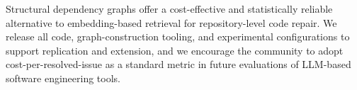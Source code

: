 Structural dependency graphs offer a cost-effective and statistically reliable alternative to embedding-based retrieval for repository-level code repair.
We release all code, graph-construction tooling, and experimental configurations to support replication and extension, and we encourage the community to adopt cost-per-resolved-issue as a standard metric in future evaluations of LLM-based software engineering tools.

\appendix
